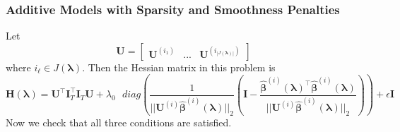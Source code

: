 \documentclass[12pt,letterpaper]{article}
\begin{document}
\subsubsection{Additive Models with Sparsity and Smoothness Penalties}
\label{sec_appendix:sparse_add_models}
Let 
\begin{equation}
\boldsymbol{U} = \begin{bmatrix}
\boldsymbol {U}^{(i_1)} & ... & \boldsymbol {U}^{(i_{|J(\boldsymbol \lambda)|})}
\end{bmatrix}
\end{equation}
where $i_\ell \in J(\boldsymbol \lambda)$. Then the Hessian matrix in this problem is
\begin{equation}
\boldsymbol{H}(\boldsymbol\lambda)
= \boldsymbol{U}^\top \boldsymbol I_T^\top \boldsymbol I_T \boldsymbol{U}
+ \lambda_0 \text{ } diag \left (
\frac{1}{||\boldsymbol {U}^{(i)}  \hat{\boldsymbol{\beta}}^{(i)} (\boldsymbol \lambda)||_2} \left (
\boldsymbol I - \frac{\hat{\boldsymbol{\beta}}^{(i)} (\boldsymbol \lambda)^\top \hat{\boldsymbol{\beta}}^{(i)} (\boldsymbol \lambda)}{||\boldsymbol {U}^{(i)}  \hat{\boldsymbol{\beta}}^{(i)} (\boldsymbol \lambda)||_2}
\right ) \right )
+ \epsilon \boldsymbol I
\label{eq:add_hessian}
\end{equation}
Now we check that all three conditions are satisfied. 
\end{document}
